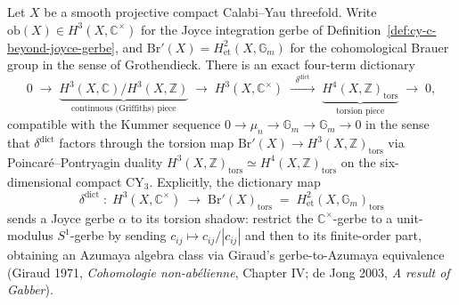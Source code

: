 \begin{proposition}
\label{prop:cy-c-beyond-joyce-brauer-dictionary}
Let $X$ be a smooth projective compact Calabi--Yau threefold. Write
$\mathrm{ob}(X) \in H^3(X, \mathbb{C}^\times)$ for the Joyce integration gerbe
of Definition~\ref{def:cy-c-beyond-joyce-gerbe}, and
$\mathrm{Br}'(X) = H^2_{\mathrm{et}}(X, \mathbb{G}_m)$ for the cohomological
Brauer group in the sense of Grothendieck. There is an exact four-term dictionary
\begin{equation}
\label{eq:cy-c-beyond-joyce-brauer-four-term}
0
\;\longrightarrow\;
\underbrace{H^3(X, \mathbb{C}) / H^3(X, \mathbb{Z})}_{\text{continuous (Griffiths) piece}}
\;\longrightarrow\;
H^3(X, \mathbb{C}^\times)
\;\xrightarrow{\;\;\delta^{\mathrm{dict}}\;\;}\;
\underbrace{H^4(X, \mathbb{Z})_{\mathrm{tors}}}_{\text{torsion piece}}
\;\longrightarrow\;
0,
\end{equation}
compatible with the Kummer sequence
$0 \to \mu_n \to \mathbb{G}_m \to \mathbb{G}_m \to 0$ in the sense that
$\delta^{\mathrm{dict}}$ factors through the torsion map
$\mathrm{Br}'(X) \to H^3(X, \mathbb{Z})_{\mathrm{tors}}$ via Poincaré--Pontryagin
duality $H^3(X, \mathbb{Z})_{\mathrm{tors}} \simeq H^4(X, \mathbb{Z})_{\mathrm{tors}}$
on the six-dimensional compact CY$_3$. Explicitly, the dictionary map
\[
\delta^{\mathrm{dict}} \;:\; H^3(X, \mathbb{C}^\times)
 \;\longrightarrow\;
 \mathrm{Br}'(X)_{\mathrm{tors}} \;=\; H^2_{\mathrm{et}}(X, \mathbb{G}_m)_{\mathrm{tors}}
\]
sends a Joyce gerbe $\alpha$ to its torsion shadow: restrict the $\mathbb{C}^\times$-gerbe
to a unit-modulus $S^1$-gerbe by sending $c_{ij} \mapsto c_{ij} / |c_{ij}|$ and
then to its finite-order part, obtaining an Azumaya algebra class via
Giraud's gerbe-to-Azumaya equivalence (Giraud 1971, \emph{Cohomologie
non-ab\'elienne}, Chapter IV; de Jong 2003, \emph{A result of Gabber}).
\end{proposition}

